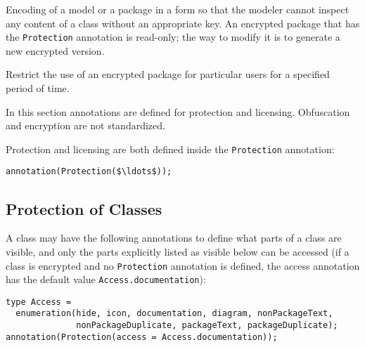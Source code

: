 \begin{definition}[Encryption]
Encoding of a model or a package in a form so that the modeler cannot inspect any content of a class without an appropriate key.  An encrypted package that has the \lstinline!Protection! annotation
is read-only; the way to modify it is to generate a new encrypted version.
\end{definition}

\begin{definition}[Licensing]
Restrict the use of an encrypted package for particular users for a specified period of time.
\end{definition}

In this section annotations are defined for protection and licensing.  Obfuscation and encryption are not standardized.

Protection and licensing are both defined inside the \lstinline!Protection! annotation:
\begin{lstlisting}[language=modelica]
annotation(Protection($\ldots$));
\end{lstlisting}

\subsection{Protection of Classes}\label{protection-of-classes}

A class may have the following annotations to define what parts of a class are visible, and only the parts explicitly listed as visible below can be accessed (if a class is encrypted and no \lstinline!Protection! annotation is defined, the access annotation has the default value \lstinline!Access.documentation!):
\begin{lstlisting}[language=modelica]
type Access =
  enumeration(hide, icon, documentation, diagram, nonPackageText,
              nonPackageDuplicate, packageText, packageDuplicate);
annotation(Protection(access = Access.documentation));
\end{lstlisting}


